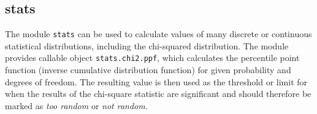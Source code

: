 \documentclass[
  digital, %
  oneside, %
  lof,     %
  lot,     %
]{fithesis4}
\begin{document}
\subsection{stats}
The module \texttt{stats} can be used to calculate values of many discrete\cite{scipydescrete} or continuous\cite{scipycontinuous} statistical distributions, including the chi-squared distribution.
The module provides callable object \texttt{stats.chi2.ppf}, which calculates the percentile point function (inverse cumulative distribution function) for given probability and degrees of freedom.\cite{scipystatschi2}
The resulting value is then used as the threshold or limit for when the results of the chi-square statistic are significant and should therefore be marked as \emph{too random} or \emph{not random}.




\end{document}
